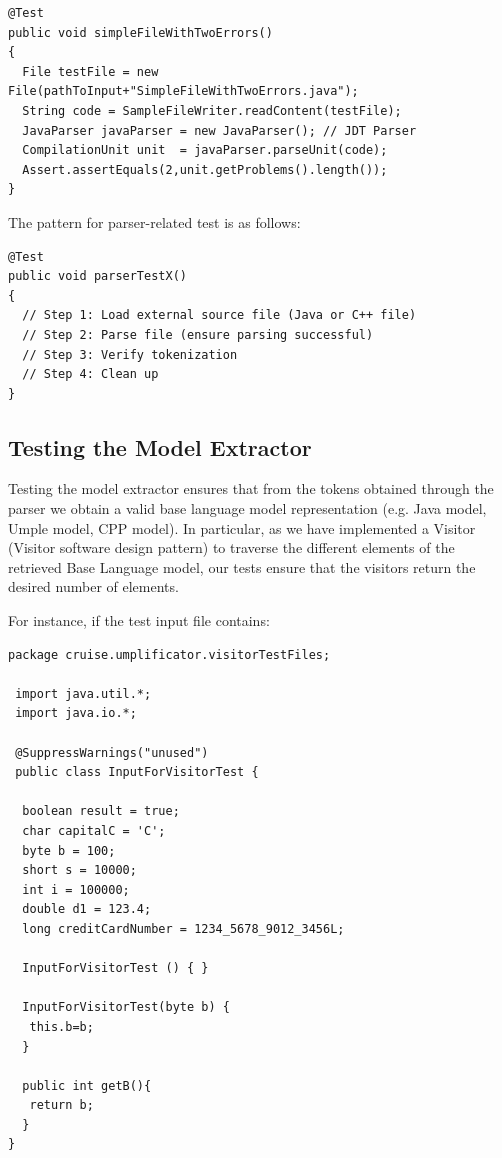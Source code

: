 \begin{lstlisting}[style=java]
@Test
public void simpleFileWithTwoErrors()
{
  File testFile = new File(pathToInput+"SimpleFileWithTwoErrors.java");
  String code = SampleFileWriter.readContent(testFile);
  JavaParser javaParser = new JavaParser(); // JDT Parser
  CompilationUnit unit  = javaParser.parseUnit(code);
  Assert.assertEquals(2,unit.getProblems().length());
}
\end{lstlisting}

The pattern for parser-related test is as follows:

\begin{lstlisting}[style=java]
@Test
public void parserTestX()
{
  // Step 1: Load external source file (Java or C++ file)
  // Step 2: Parse file (ensure parsing successful) 
  // Step 3: Verify tokenization
  // Step 4: Clean up
}
\end{lstlisting}

\subsection{Testing the Model Extractor}

Testing the model extractor ensures that from the tokens obtained through the parser we obtain a valid base language model representation (e.g. Java model, Umple model, CPP model). In particular, as we have implemented a Visitor (Visitor software design pattern) to traverse the different elements of the retrieved Base Language model, our tests ensure that the visitors return the desired number of elements.

For instance, if the test input file contains: 

\begin{lstlisting}[style=java, label={lst:inputVisitor}, caption=Java input file for test.]
package cruise.umplificator.visitorTestFiles;

 import java.util.*;
 import java.io.*;

 @SuppressWarnings("unused")
 public class InputForVisitorTest { 

  boolean result = true;
  char capitalC = 'C';
  byte b = 100;
  short s = 10000;
  int i = 100000;
  double d1 = 123.4;
  long creditCardNumber = 1234_5678_9012_3456L;

  InputForVisitorTest () { }

  InputForVisitorTest(byte b) {
   this.b=b;
  }

  public int getB(){
   return b;
  }
}
\end{lstlisting}

